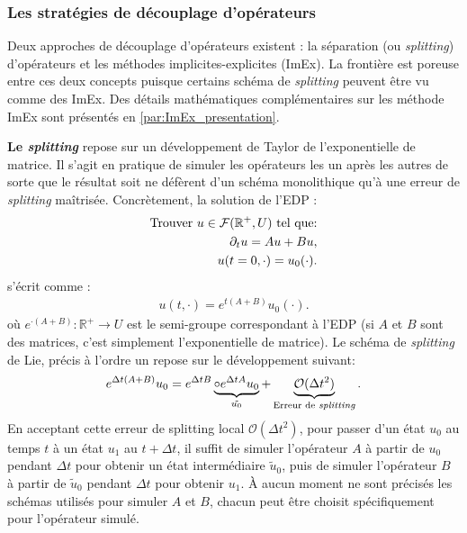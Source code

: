     \subsubsection{Les stratégies de découplage d'opérateurs}
        Deux approches de découplage d'opérateurs existent : la séparation (ou \textit{splitting}) d'opérateurs et les méthodes implicites-explicites (ImEx).
        La frontière est poreuse entre ces deux concepts puisque certains schéma de \textit{splitting} peuvent être vu comme des ImEx. 
        Des détails mathématiques complémentaires sur les méthode ImEx sont présentés en \ref{par:ImEx_presentation}.\par
        \textbf{Le \textit{splitting}} repose sur un développement de Taylor de l'exponentielle de matrice.
        Il s'agit en pratique de simuler les opérateurs les un après les autres de sorte que le résultat soit ne défèrent d'un schéma monolithique
        qu'à une erreur de \textit{splitting} maîtrisée.
        Concrètement, la solution de l'EDP :
        \begin{align}
            \notag\text{Trouver }u \in \mathcal F (\mathbb R^+,U) \text{ tel que:}\\
            \partial_t u = Au + Bu,\\\notag
            u(t=0,\cdot) = u_0(\cdot).
        \end{align}            
        s'écrit comme :
        \begin{align}
            u(t,\cdot) = e^{t(A+B)}u_0(\cdot).
        \end{align}
        où $e^{\cdot(A+B)} : \mathbb R^+ \rightarrow U$ est le semi-groupe correspondant à l'EDP (si $A$ et $B$ sont des matrices, c'est simplement l’exponentielle de matrice).
        Le schéma de \textit{splitting} de Lie, précis à l'ordre un repose sur le développement suivant:
        \begin{align}
            e^{\Delta t(A+B)}u_0 = e^{\Delta tB} \underbrace{\circ e^{\Delta tA}u_0}_{\tilde{u_0}} + \underbrace{\mathcal O (\Delta t^2)}_{\text{Erreur de \textit{splitting}}}.
        \end{align}
        En acceptant cette erreur de splitting local $ \mathcal O (\Delta t^2)$, pour passer d'un état $u_0$ au temps $t$ à un état $u_1$ au $t+\Delta t$, 
        il suffit de simuler l'opérateur $A$ à partir de $u_0$ pendant $\Delta t$ pour obtenir un état intermédiaire $\tilde{u}_0$,
        puis de simuler l'opérateur $B$ à partir de $\tilde{u}_0$ pendant $\Delta t$ pour obtenir $u_1$.
        À aucun moment ne sont précisés les schémas utilisés pour simuler $A$ et $B$, chacun peut être choisit spécifiquement pour l'opérateur simulé.
